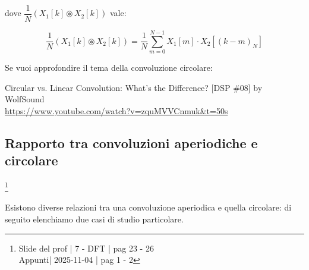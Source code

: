 dove $ \dfrac{1}{N} \left( X_1 \left[ k\right] \circledast X_2 \left[ k\right] \right)$ vale: 

{
    \Large 
    \begin{equation}
        \dfrac{1}{N}
        \left(
        X_1 \left[ k\right]
        \circledast
        X_2 \left[ k\right] 
        \right)
        =
        \dfrac{1}{N}
        \sum_{m = 0}^{N - 1}
        X_1 \left[ m\right]
        \cdot
        X_2 \left[ \left( k- m\right)_{N}\right]  
    \end{equation}
}

\newpage 

\begin{tcolorbox}
    Se vuoi approfondire il tema della convoluzione circolare: \newline 

    Circular vs. Linear Convolution: What's the Difference? [DSP \#08] by WolfSound \\ 
    \url{https://www.youtube.com/watch?v=zquMVVCnmuk&t=50s}
\end{tcolorbox}

\newpage 

\subsection{Rapporto tra convoluzioni aperiodiche e circolare}

\footnote{ 
    Slide del prof | 7 - DFT | pag 23 - 26\\
    Appunti| 2025-11-04 | pag 1 - 2
}

Esistono diverse relazioni tra una convoluzione aperiodica e quella circolare: 
di seguito elenchiamo due casi di studio particolare. \newline 


